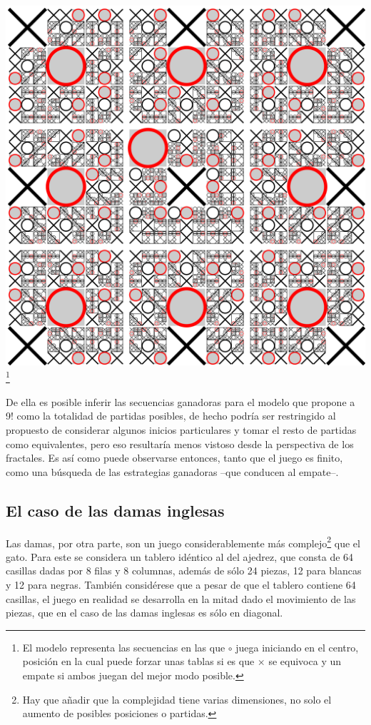 \documentclass[twoside,openright,12pt,a4paper,spanish]{book}
\begin{document}
\begin{center}
    \includegraphics[width=10.0 cm,height=10.0 cm]{Tictactoe-O.svg.png}\footnote{El modelo representa las secuencias en las que $\circ$ juega iniciando en el centro, posici\'on en la cual puede forzar unas tablas si es que $\times$ se equivoca y un empate si ambos juegan del mejor modo posible.}
\end{center}

De ella es posible inferir las secuencias ganadoras para el modelo que propone a 9! como la totalidad de partidas posibles, de hecho podr\'ia ser restringido al propuesto de considerar algunos inicios particulares y tomar el resto de partidas como equivalentes, pero eso resultar\'ia menos vistoso desde la perspectiva de los fractales. Es as\'i como puede observarse entonces, tanto que el juego es finito, como una búsqueda de las estrategias ganadoras --que conducen al empate--. 

\subsection{El caso de las damas inglesas}

\noindent Las damas, por otra parte, son un juego considerablemente m\'as complejo\footnote{Hay que añadir que la complejidad tiene varias dimensiones, no solo el aumento de posibles posiciones o partidas.} que el gato. Para este se considera un tablero idéntico al del ajedrez, que consta de 64 casillas dadas por 8 filas y 8 columnas, adem\'as de s\'olo 24 piezas, 12 para blancas y 12 para negras. Tambi\'en consid\'erese que a pesar de que el tablero contiene 64 casillas, el juego en realidad se desarrolla en la mitad dado el movimiento de las piezas, que en el caso de las damas inglesas es s\'olo en diagonal.
\end{document}
